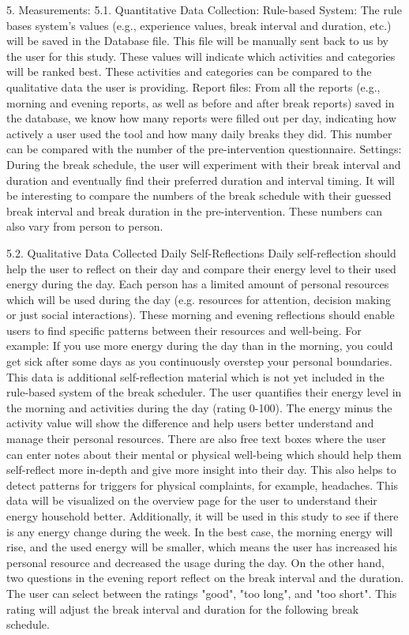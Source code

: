 \documentclass{hasel_thesis}
\begin{document}
5.	Measurements:
5.1.	Quantitative Data Collection:
Rule-based System:
The rule bases system's values (e.g., experience values, break interval and duration, etc.) will be saved in the Database file. This file will be manually sent back to us by the user for this study. These values will indicate which activities and categories will be ranked best. These activities and categories can be compared to the qualitative data the user is providing. 
Report files:
From all the reports (e.g., morning and evening reports, as well as before and after break reports) saved in the database, we know how many reports were filled out per day, indicating how actively a user used the tool and how many daily breaks they did. This number can be compared with the number of the pre-intervention questionnaire. 
Settings:
During the break schedule, the user will experiment with their break interval and duration and eventually find their preferred duration and interval timing. It will be interesting to compare the numbers of the break schedule with their guessed break interval and break duration in the pre-intervention. These numbers can also vary from person to person.

5.2.	Qualitative Data Collected
Daily Self-Reflections
Daily self-reflection should help the user to reflect on their day and compare their energy level to their used energy during the day. Each person has a limited amount of personal resources which will be used during the day (e.g. resources for attention, decision making or just social interactions). These morning and evening reflections should enable users to find specific patterns between their resources and well-being. For example: If you use more energy during the day than in the morning, you could get sick after some days as you continuously overstep your personal boundaries. This data is additional self-reflection material which is not yet included in the rule-based system of the break scheduler. The user quantifies their energy level in the morning and activities during the day (rating 0-100). The energy minus the activity value will show the difference and help users better understand and manage their personal resources. There are also free text boxes where the user can enter notes about their mental or physical well-being which should help them self-reflect more in-depth and give more insight into their day. This also helps to detect patterns for triggers for physical complaints, for example, headaches. This data will be visualized on the overview page for the user to understand their energy household better. Additionally, it will be used in this study to see if there is any energy change during the week. In the best case, the morning energy will rise, and the used energy will be smaller, which means the user has increased his personal resource and decreased the usage during the day. 
On the other hand, two questions in the evening report reflect on the break interval and the duration. The user can select between the ratings "good", "too long", and "too short". This rating will adjust the break interval and duration for the following break schedule.
\end{document}
